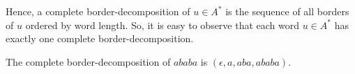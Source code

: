 Hence, a complete border-decomposition of $u\in A^*$ is the sequence of all borders of $u$ ordered by word length. So, it is easy to observe that each word $u\in A^*$ has exactly one complete border-decomposition.


\begin{example}
	The  complete border-decomposition of $ababa$ is $(\epsilon, a, aba, ababa)$.
\end{example}

%

